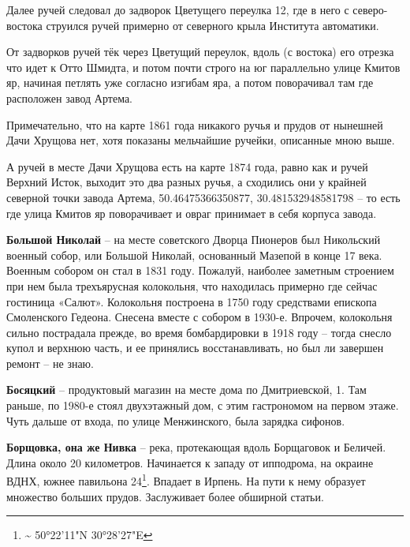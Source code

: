 Далее ручей следовал до задворок Цветущего переулка 12, где в него с северо-востока струился ручей примерно от северного крыла Института автоматики.

От задворков ручей тёк через Цветущий переулок, вдоль (с востока) его отрезка что идет к Отто Шмидта, и потом почти строго на юг параллельно улице Кмитов яр, начиная петлять уже согласно изгибам яра, а потом поворачивал там где расположен завод Артема.

Примечательно, что на карте 1861 года никакого ручья и прудов от нынешней Дачи Хрущова нет, хотя показаны мельчайшие ручейки, описанные мною выше. 

А ручей в месте Дачи Хрущова есть на карте 1874 года, равно как и ручей Верхний Исток, выходит это два разных ручья, а сходились они у крайней северной точки завода Артема, 50.46475366350877, 30.481532948581798 – то есть где улица Кмитов яр поворачивает и овраг принимает в себя корпуса завода.\\

\medskip

\textbf{Большой Николай} – на месте советского Дворца Пионеров был Никольский военный собор, или Большой Николай, основанный Мазепой в конце 17 века. Военным собором он стал в 1831 году. Пожалуй, наиболее заметным строением при нем была трехъярусная колокольня, что находилась примерно где сейчас гостиница «Салют». Колокольня построена в 1750 году средствами епископа Смоленского Гедеона. Снесена вместе с собором в 1930-е. Впрочем, колокольня сильно пострадала прежде, во время бомбардировки в 1918 году – тогда снесло купол и верхнюю часть, и ее принялись восстанавливать, но был ли завершен ремонт – не знаю.\\

\medskip

\textbf{Босяцкий} – продуктовый магазин на месте дома по Дмитриевской, 1. Там раньше, по 1980-е стоял двухэтажный дом, с этим гастрономом на первом этаже. Чуть дальше от входа, по улице Менжинского, была зарядка сифонов.\\

\medskip

\textbf{Борщовка, она же Нивка} – река, протекающая вдоль Борщаговок и Беличей. Длина около 20 километров. Начинается к западу от ипподрома, на окраине ВДНХ, южнее павильона 24\footnote{\textasciitilde{} 50°22'11"N 30°28'27"E}. Впадает в Ирпень. На пути к нему образует множество больших прудов. Заслуживает более обширной статьи.\\

